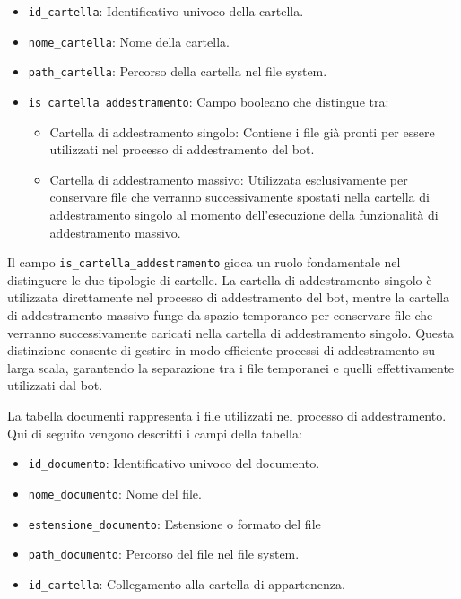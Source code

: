 \documentclass[a4paper,twoside,12pt]{toptesi}
\begin{document}
\begin{itemize}
\item \textnormal{\lstinline|id_cartella|}: Identificativo univoco della cartella.
\item \textnormal{\lstinline|nome_cartella|}: Nome della cartella.
\item \textnormal{\lstinline|path_cartella|}: Percorso della cartella nel file system.
\item \textnormal{\lstinline|is_cartella_addestramento|}: Campo booleano che distingue tra:
	\begin{itemize}
	\item Cartella di addestramento singolo: Contiene i file già pronti per essere utilizzati nel processo di addestramento del bot.
	\item Cartella di addestramento massivo: Utilizzata esclusivamente per conservare file che verranno successivamente spostati nella cartella di addestramento singolo al 					momento dell’esecuzione della funzionalità di addestramento massivo.
	\end{itemize}
\end{itemize}

Il campo \textnormal{\lstinline|is_cartella_addestramento|} gioca un ruolo fondamentale nel distinguere le due tipologie di cartelle. La cartella di addestramento singolo è utilizzata direttamente nel processo di addestramento del bot, mentre la cartella di addestramento massivo funge da spazio temporaneo per conservare file che verranno successivamente caricati nella cartella di addestramento singolo. Questa distinzione consente di gestire in modo efficiente processi di addestramento su larga scala, garantendo la separazione tra i file temporanei e quelli effettivamente utilizzati dal bot.

La tabella documenti rappresenta i file utilizzati nel processo di addestramento. Qui di seguito vengono descritti i campi della tabella:
\begin{itemize}
\item \textnormal{\lstinline|id_documento|}: Identificativo univoco del documento.
\item \textnormal{\lstinline|nome_documento|}: Nome del file.
\item \textnormal{\lstinline|estensione_documento|}: Estensione o formato del file
\item \textnormal{\lstinline|path_documento|}: Percorso del file nel file system.
\item \textnormal{\lstinline|id_cartella|}: Collegamento alla cartella di appartenenza.
\end{itemize}
\end{document}
